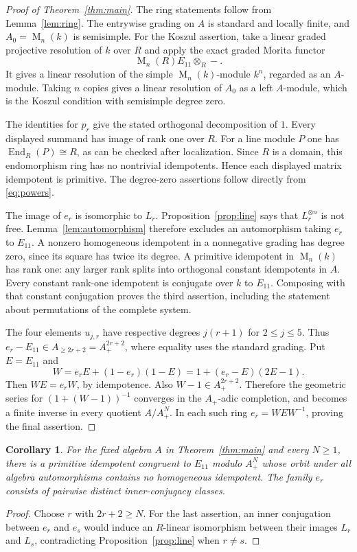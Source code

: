 \documentclass[11pt]{article}
\newtheorem{corollary}[theorem]{Corollary}
\theoremstyle{remark}
\DeclareMathOperator{\Mat}{M}
\begin{document}
\begin{proof}[Proof of Theorem~\ref{thm:main}]
The ring statements follow from Lemma~\ref{lem:ring}. The entrywise grading on $A$ is standard and locally finite, and $A_0=\Mat_n(k)$ is semisimple. For the Koszul assertion, take a linear graded projective resolution of $k$ over $R$ and apply the exact graded Morita functor
\[
 \Mat_n(R)E_{11}\otimes_R -.
\]
It gives a linear resolution of the simple $\Mat_n(k)$-module $k^n$, regarded as an $A$-module. Taking $n$ copies gives a linear resolution of $A_0$ as a left $A$-module, which is the Koszul condition with semisimple degree zero.

The identities for $p_r$ give the stated orthogonal decomposition of $1$. Every displayed summand has image of rank one over $R$. For a line module $P$ one has $\operatorname{End}_R(P)\cong R$, as can be checked after localization. Since $R$ is a domain, this endomorphism ring has no nontrivial idempotents. Hence each displayed matrix idempotent is primitive. The degree-zero assertions follow directly from \eqref{eq:powers}.

The image of $e_r$ is isomorphic to $L_r$. Proposition~\ref{prop:line} says that $L_r^{\otimes n}$ is not free. Lemma~\ref{lem:automorphism} therefore excludes an automorphism taking $e_r$ to $E_{11}$. A nonzero homogeneous idempotent in a nonnegative grading has degree zero, since its square has twice its degree. A primitive idempotent in $\Mat_n(k)$ has rank one: any larger rank splits into orthogonal constant idempotents in $A$. Every constant rank-one idempotent is conjugate over $k$ to $E_{11}$. Composing with that constant conjugation proves the third assertion, including the statement about permutations of the complete system.

The four elements $u_{j,r}$ have respective degrees $j(r+1)$ for $2\leq j\leq5$. Thus $e_r-E_{11}\in A_{\geq2r+2}=A_+^{2r+2}$, where equality uses the standard grading. Put $E=E_{11}$ and
\begin{equation}\label{eq:formal}
 W=e_rE+(1-e_r)(1-E)=1+(e_r-E)(2E-1).
\end{equation}
Then $WE=e_rW$, by idempotence. Also $W-1\in A_+^{2r+2}$. Therefore the geometric series for $(1+(W-1))^{-1}$ converges in the $A_+$-adic completion, and becomes a finite inverse in every quotient $A/A_+^N$. In each such ring $e_r=WEW^{-1}$, proving the final assertion.
\end{proof}

\begin{corollary}\label{cor:jets}
For the fixed algebra $A$ in Theorem~\ref{thm:main} and every $N\geq1$, there is a primitive idempotent congruent to $E_{11}$ modulo $A_+^N$ whose orbit under all algebra automorphisms contains no homogeneous idempotent. The family $e_r$ consists of pairwise distinct inner-conjugacy classes.
\end{corollary}
\begin{proof}
Choose $r$ with $2r+2\geq N$. For the last assertion, an inner conjugation between $e_r$ and $e_s$ would induce an $R$-linear isomorphism between their images $L_r$ and $L_s$, contradicting Proposition~\ref{prop:line} when $r\ne s$.
\end{proof}
\end{document}

